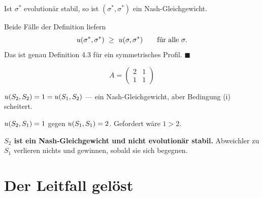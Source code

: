 \begin{merksatz}
Ist $\sigma^{*}$ evolutionär stabil, so ist $(\sigma^{*},\sigma^{*})$ ein Nash-Gleichgewicht.

Beide Fälle der Definition liefern
\[ \Aus(\sigma^{*},\sigma^{*}) \ \ge\ \Aus(\sigma,\sigma^{*}) \qquad\text{für alle } \sigma . \]
Das ist genau Definition 4.3 für ein symmetrisches Profil. $\blacksquare$

\[ A = \begin{pmatrix} 2 & 1\\ 1 & 1\end{pmatrix} \]

 $u(S_2,S_2) = 1 = u(S_1,S_2)$ --- ein Nash-Gleichgewicht, aber Bedingung (i) scheitert.

 $u(S_2,S_1) = 1$ gegen $u(S_1,S_1) = 2$. Gefordert wäre $1 > 2$.

\begin{center}
\begin{minipage}{0.9\textwidth}
\textbf{$S_2$ ist ein Nash-Gleichgewicht und nicht evolutionär stabil.} Abweichler zu $S_1$ verlieren nichts und gewinnen, sobald sie sich begegnen.
\end{minipage}
\end{center}

\begin{center}
\begin{minipage}{0.88\textwidth}
\end{minipage}
\end{center}
\end{merksatz}

\section{Der Leitfall gelöst}

